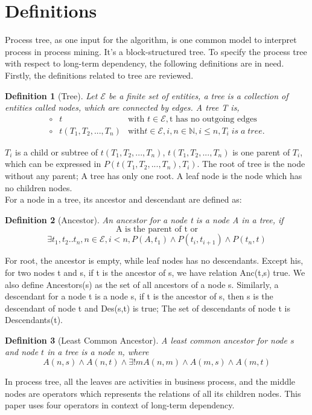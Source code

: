 \documentclass[]{article}
\newtheorem{mydef}{Definition}[section]
\begin{document}

\section{Definitions}
Process tree, as one input for the algorithm, is one common model to interpret process in process mining. It's a block-structured tree. To specify the process tree with respect to long-term dependency, the following definitions are in need. Firstly, the definitions related to tree are reviewed.
\begin{mydef}[Tree]
	Let $ \mathscr{E} $ be a finite set of entities, a tree is a collection of entities called nodes, which are connected by edges. A tree T is,
	\[
	\begin{array}{ rll}
		\circ&t & \mbox{with } t\in \mathscr{E},  \text{t has no outgoing edges}\\
		\circ&t(T_1,T_2,...,T_n) & \mbox{with} t\in \mathscr{E}, i,n\in \mathbb{N}, i \leq n ,T_i\;is\; a\; tree.
	\end{array}
	\]
\end{mydef}
$T_i$ is a child or subtree of $t(T_1,T_2,...,T_n)$, $t(T_1,T_2,...,T_n)$ is one parent of $T_i$, which can be expressed in $P(t(T_1,T_2,...,T_n),T_i)$. The root of tree is the node without any parent; A tree has only one root. A leaf node is the node which has no children nodes.\\
For a node in a tree, its ancestor and descendant are defined as:
\begin{mydef}[Ancestor]
	An ancestor for a node t is a node A in a tree, if 
	\[\text{A is the parent of t or} \]
	\[ \exists t_1,t_2..t_n,n\in \mathscr{E}, i < n, P(A,t_1)\land P(t_i,t_{i+1}) \land P(t_n,t) \]
\end{mydef}
For root, the ancestor is empty, while leaf nodes has no descendants. Except his, for two nodes t and s, if t is the ancestor of s, we have relation Anc(t,s) true. We also define Ancestors(s) as the set of all ancestors of a node s. Similarly, a descendant for a node t is a node s, if t is the ancestor of s, then s is the descendant of node t and Des(s,t) is true; The set of descendants of node t is Descendants(t).
\begin{mydef}[Least Common Ancestor]
	A least common ancestor for node $s$ and node $t$ in a tree is a node n, where 
	\[A(n,s) \land A(n,t) \land \exists! m A(n,m) \land A(m,s) \land A(m,t) \]
\end{mydef}
In process tree, all the leaves are activities in business process, and the middle nodes are operators which represents the relations of all its children nodes\cite{vanderAalst:2016:PMD:2948762,leemans2013discovering}. This paper uses four operators in context of long-term dependency.
\end{document}
